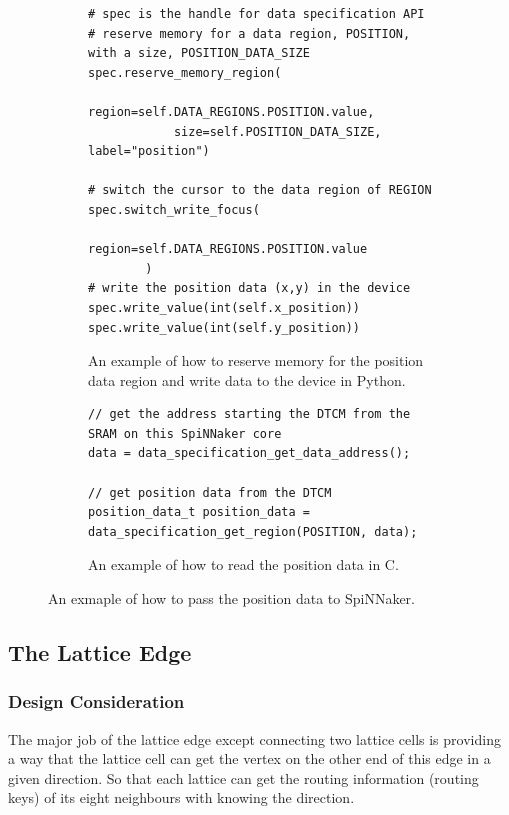\begin{figure}[!ht]
\setcounter{tmp}{\thefigure}
\setcounter{figure}{\thelstlisting}
\captionsetup{list=no,name=Listing}
\begin{subfigure}{\linewidth}
\begin{lstlisting}
# spec is the handle for data specification API
# reserve memory for a data region, POSITION, with a size, POSITION_DATA_SIZE
spec.reserve_memory_region(
            region=self.DATA_REGIONS.POSITION.value,
            size=self.POSITION_DATA_SIZE, label="position")

# switch the cursor to the data region of REGION
spec.switch_write_focus(
            region=self.DATA_REGIONS.POSITION.value
        )
# write the position data (x,y) in the device 
spec.write_value(int(self.x_position))
spec.write_value(int(self.y_position))
\end{lstlisting}
\caption{An example of how to reserve memory for the position data region and write data to the device in Python.\\}
\label{lst:code1}
\end{subfigure}
\begin{subfigure}{\linewidth}
\begin{lstlisting}
// get the address starting the DTCM from the SRAM on this SpiNNaker core
data = data_specification_get_data_address();

// get position data from the DTCM
position_data_t position_data = data_specification_get_region(POSITION, data);
\end{lstlisting}
\caption{An example of how to read the position data in C.}
\label{lst:code2}
\end{subfigure}
\caption{An exmaple of how to pass the position data to SpiNNaker.}
\label{lst:general}
\setcounter{figure}{\thetmp}
\end{figure}


\subsection{The Lattice Edge} \label{sec:tle}
\subsubsection{Design Consideration}
The major job of the lattice edge except connecting two lattice cells is providing a way that the lattice cell can get the vertex on the other end of this edge in a given direction. So that each lattice can get the routing information (routing keys) of its eight neighbours with knowing the direction. 
